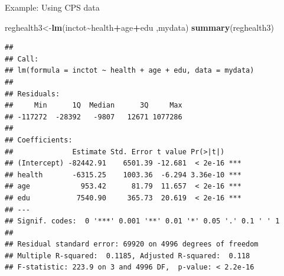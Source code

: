 \documentclass[
  ignorenonframetext,
]{beamer}
\newenvironment{Shaded}{\begin{snugshade}}{\end{snugshade}}
\newcommand{\KeywordTok}[1]{\textcolor[rgb]{0.13,0.29,0.53}{\textbf{#1}}}
\newcommand{\NormalTok}[1]{#1}
\newcommand{\OperatorTok}[1]{\textcolor[rgb]{0.81,0.36,0.00}{\textbf{#1}}}
\begin{document}
\begin{frame}[fragile]{Example: Using CPS data}
\protect\hypertarget{example-using-cps-data-7}{}
\tiny

\begin{Shaded}
\begin{Highlighting}[]
\NormalTok{reghealth3\textless{}{-}}\KeywordTok{lm}\NormalTok{(inctot}\OperatorTok{\textasciitilde{}}\NormalTok{health}\OperatorTok{+}\NormalTok{age}\OperatorTok{+}\NormalTok{edu ,mydata)}
\KeywordTok{summary}\NormalTok{(reghealth3)}
\end{Highlighting}
\end{Shaded}

\begin{verbatim}
## 
## Call:
## lm(formula = inctot ~ health + age + edu, data = mydata)
## 
## Residuals:
##     Min      1Q  Median      3Q     Max 
## -117272  -28392   -9807   12671 1077286 
## 
## Coefficients:
##              Estimate Std. Error t value Pr(>|t|)    
## (Intercept) -82442.91    6501.39 -12.681  < 2e-16 ***
## health       -6315.25    1003.36  -6.294 3.36e-10 ***
## age            953.42      81.79  11.657  < 2e-16 ***
## edu           7540.90     365.73  20.619  < 2e-16 ***
## ---
## Signif. codes:  0 '***' 0.001 '**' 0.01 '*' 0.05 '.' 0.1 ' ' 1
## 
## Residual standard error: 69920 on 4996 degrees of freedom
## Multiple R-squared:  0.1185, Adjusted R-squared:  0.118 
## F-statistic: 223.9 on 3 and 4996 DF,  p-value: < 2.2e-16
\end{verbatim}

\normalsize
\end{frame}
\end{document}
